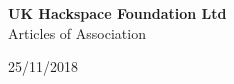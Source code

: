 

\begin{titlepage}
\begin{center}
{\bf \LARGE UK Hackspace Foundation Ltd}\\[36pt]
{\Large Articles of Association}

25/11/2018
\vfill

\end{center}
\end{titlepage}
\tableofcontents


